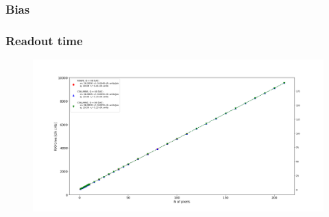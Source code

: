    \begin{frame}
        \frametitle{Bias}
        \begin{figure}[h!]
            \centering
        \end{figure}
    \end{frame}      

    \begin{frame}
        \frametitle{Readout time}
        \begin{figure}[h!]
            \centering
            \includegraphics[width=.2\linewidth]{figures/charaterization/default_line.png}
        \end{figure}
    \end{frame}          